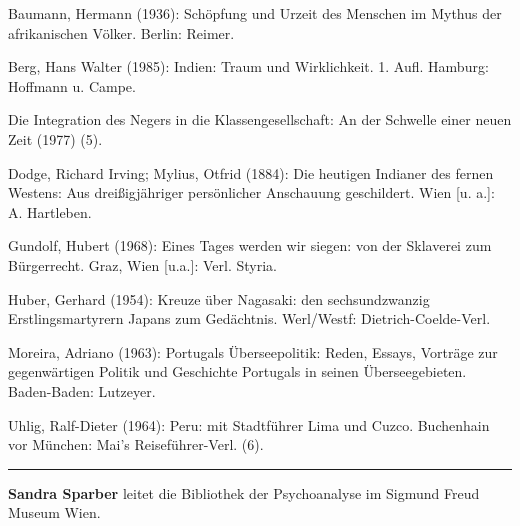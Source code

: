 \documentclass[a4paper,
fontsize=11pt,
oneside,
numbers=noperiodatend,
parskip=half-,
bibliography=totoc,
final
]{scrartcl}
\begin{document}
Baumann, Hermann (1936): Schöpfung und Urzeit des Menschen im Mythus der
afrikanischen Völker. Berlin: Reimer.

Berg, Hans Walter (1985): Indien: Traum und Wirklichkeit. 1. Aufl.
Hamburg: Hoffmann u. Campe.

Die Integration des Negers in die Klassengesellschaft: An der Schwelle
einer neuen Zeit (1977) (5).

Dodge, Richard Irving; Mylius, Otfrid (1884): Die heutigen Indianer des
fernen Westens: Aus dreißigjähriger persönlicher Anschauung geschildert.
Wien {[}u. a.{]}: A. Hartleben.

Gundolf, Hubert (1968): Eines Tages werden wir siegen: von der Sklaverei
zum Bürgerrecht. Graz, Wien {[}u.a.{]}: Verl. Styria.

Huber, Gerhard (1954): Kreuze über Nagasaki: den sechsundzwanzig
Erstlingsmartyrern Japans zum Gedächtnis. Werl/Westf:
Dietrich-Coelde-Verl.

Moreira, Adriano (1963): Portugals Überseepolitik: Reden, Essays,
Vorträge zur gegenwärtigen Politik und Geschichte Portugals in seinen
Überseegebieten. Baden-Baden: Lutzeyer.

Uhlig, Ralf-Dieter (1964): Peru: mit Stadtführer Lima und Cuzco.
Buchenhain vor München: Mai's Reiseführer-Verl. (6).

\begin{center}\rule{0.5\linewidth}{0.5pt}\end{center}

\textbf{Sandra Sparber} leitet die Bibliothek der Psychoanalyse im
Sigmund Freud Museum Wien.
\end{document}
